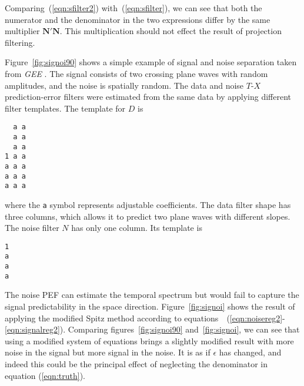 Comparing~(\ref{eqn:sfilter2}) with~(\ref{eqn:sfilter}), we can see
that both the numerator and the denominator in the two expressions
differ by the same multiplier $\mathbf{N' N}$. This multiplication
should not effect the result of projection filtering.
\par
Figure~\ref{fig:signoi90} shows a simple example of signal and noise
separation taken from \emph{GEE} \cite[]{gee}. The signal consists of
two crossing plane waves with random amplitudes, and the noise is
spatially random. The data and noise $T$-$X$ prediction-error filters
were estimated from the same data by applying different filter
templates. The template for $D$ is
\begin{verbatim}
  a a
  a a
  a a
1 a a
a a a
a a a
a a a
\end{verbatim}
where the \texttt{a} symbol represents adjustable coefficients.  The
data filter shape has three columns, which allows it to predict two
plane waves with different slopes.  The noise filter $N$ has
only one column. Its template is
\begin{verbatim}
1
a
a
a
\end{verbatim}
The noise PEF can estimate the temporal spectrum but would fail to
capture the signal predictability in the space direction.
Figure~\ref{fig:signoi} shows the result of applying the modified
Spitz method according to
equations~~(\ref{eqn:noisereg2}-\ref{eqn:signalreg2}).
Comparing
figures~\ref{fig:signoi90} and~\ref{fig:signoi},
we can see that using
a modified system of equations brings
a slightly modified result with more noise in the signal
but more signal in the noise.
It is as if $\epsilon$ has changed,
and indeed this could be the principal effect
of neglecting the denominator in equation (\ref{eqn:truth}).




